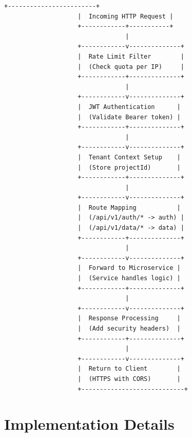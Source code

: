 \documentclass[11pt,a4paper]{report}
\begin{document}
\begin{lstlisting}[language=text]
                    +------------------------+
                    |  Incoming HTTP Request |
                    +------------+-----------+
                                 |
                    +------------v--------------+
                    |  Rate Limit Filter        |
                    |  (Check quota per IP)     |
                    +------------+--------------+
                                 |
                    +------------v--------------+
                    |  JWT Authentication      |
                    |  (Validate Bearer token) |
                    +------------+--------------+
                                 |
                    +------------v--------------+
                    |  Tenant Context Setup    |
                    |  (Store projectId)       |
                    +------------+--------------+
                                 |
                    +------------v--------------+
                    |  Route Mapping           |
                    |  (/api/v1/auth/* -> auth) |
                    |  (/api/v1/data/* -> data) |
                    +------------+--------------+
                                 |
                    +------------v--------------+
                    |  Forward to Microservice |
                    |  (Service handles logic) |
                    +------------+--------------+
                                 |
                    +------------v--------------+
                    |  Response Processing     |
                    |  (Add security headers)  |
                    +------------+--------------+
                                 |
                    +------------v--------------+
                    |  Return to Client        |
                    |  (HTTPS with CORS)       |
                    +----------------------------+
\end{lstlisting}


\section{Implementation Details}
\end{document}
